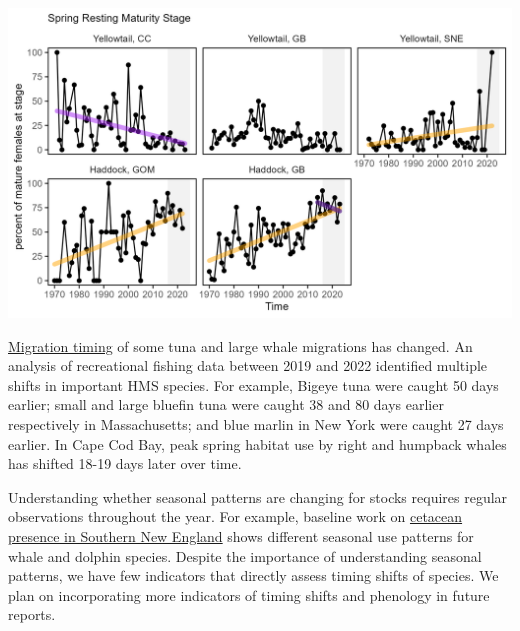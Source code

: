 \documentclass[
  10pt,
]{article}
\let\origfigure\figure
\let\endorigfigure\endfigure
\renewenvironment{figure}[1][2] {
    \expandafter\origfigure\expandafter[H]
} {
    \endorigfigure
}
\begin{document}
\begin{figure}

{\centering \includegraphics[width=6.5in]{images/BothReports/spawn_timing_BothReports_2025-09-09} 

}

\caption{Percent resting stage (non-spawning) mature female fish (black) from spring NEFSC bottom trawl survey with significant increases (orange) and decreases (purple) from two haddock and three yellowtail flounder stocks: CC = Cape Cod Gulf of Maine, GOM = Gulf of Maine, GB = Georges Bank, SNE = Southern New England.}\label{fig:spawntiming}
\end{figure}

\href{https://noaa-edab.github.io/catalog/timing_shifts.html}{Migration timing} of some tuna and large whale migrations has changed. An analysis of recreational fishing data between 2019 and 2022 identified multiple shifts in important HMS species. For example, Bigeye tuna were caught 50 days earlier; small and large bluefin tuna were caught 38 and 80 days earlier respectively in Massachusetts; and blue marlin in New York were caught 27 days earlier. In Cape Cod Bay, peak spring habitat use by right and humpback whales has shifted 18-19 days later over time.

Understanding whether seasonal patterns are changing for stocks requires regular observations throughout the year. For example, baseline work on \href{https://noaa-edab.github.io/catalog/cetacean_acoustic.html}{cetacean presence in Southern New England} shows different seasonal use patterns for whale and dolphin species. Despite the importance of understanding seasonal patterns, we have few indicators that directly assess timing shifts of species. We plan on incorporating more indicators of timing shifts and phenology in future reports.
\end{document}
